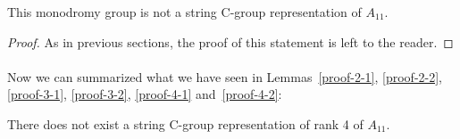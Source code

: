 \begin{lemma}
  \label{proof-4-2}
  This monodromy group is not a string C-group representation of $A_{11}$.
\end{lemma}

\begin{proof}
  As in previous sections, the proof of this statement is left to the reader.
\end{proof}

\paragraph{}
Now we can summarized what we have seen in Lemmas~\ref{proof-2-1}, \ref{proof-2-2}, \ref{proof-3-1}, \ref{proof-3-2}, \ref{proof-4-1} and~\ref{proof-4-2}:

\begin{theorem}
  There does not exist a string C-group representation of rank 4 of $A_{11}$.
\end{theorem}
